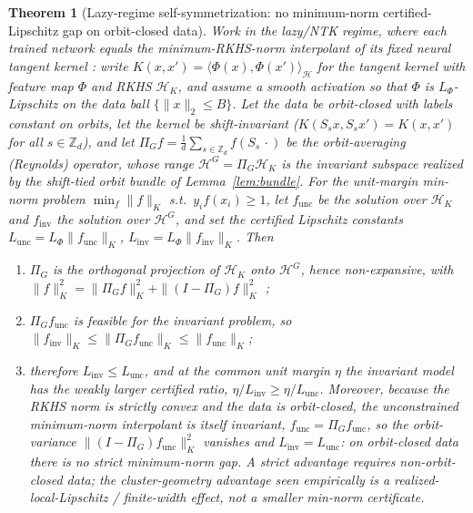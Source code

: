 \documentclass{article}
\newtheorem{theorem}{Theorem}
\theoremstyle{definition}
\newcommand{\Z}{\mathbb{Z}}
\newcommand{\dd}{d}
\begin{document}
\begin{theorem}[Lazy-regime self-symmetrization: no minimum-norm certified-Lipschitz gap on orbit-closed data]\label{thm:lazy-cluster}
Work in the lazy/NTK regime, where each trained network equals the minimum-RKHS-norm
interpolant of its fixed neural tangent kernel \citep{jacot2018neural}: write
$K(x,x')=\langle\Phi(x),\Phi(x')\rangle_{\mathcal H}$ for the tangent kernel with feature
map $\Phi$ and RKHS $\mathcal H_K$, and assume a smooth activation so that $\Phi$ is
$L_\Phi$-Lipschitz on the data ball $\{\|x\|_2\le B\}$. Let the data be orbit-closed with
labels constant on orbits, let the kernel be shift-invariant
($K(S_sx,S_sx')=K(x,x')$ for all $s\in\Z_\dd$), and let
$\Pi_G f=\tfrac1\dd\sum_{s\in\Z_\dd}f(S_s\,\cdot)$ be the orbit-averaging (Reynolds)
operator, whose range $\mathcal H^G=\Pi_G\mathcal H_K$ is the invariant subspace realized by
the shift-tied orbit bundle of Lemma~\ref{lem:bundle}. For the unit-margin min-norm problem
$\min_{f}\|f\|_K$ s.t.\ $y_i f(x_i)\ge1$, let $f_{\mathrm{unc}}$ be the solution over
$\mathcal H_K$ and $f_{\mathrm{inv}}$ the solution over $\mathcal H^G$, and set the certified
Lipschitz constants $L_{\mathrm{unc}}=L_\Phi\|f_{\mathrm{unc}}\|_K$,
$L_{\mathrm{inv}}=L_\Phi\|f_{\mathrm{inv}}\|_K$. Then
\begin{enumerate}[leftmargin=1.7em,label=\textup{(\roman*)}]
\item $\Pi_G$ is the orthogonal projection of $\mathcal H_K$ onto $\mathcal H^G$, hence
  non-expansive, with $\|f\|_K^2=\|\Pi_G f\|_K^2+\|(I-\Pi_G)f\|_K^2$ \citep{elesedy2021provably};
\item $\Pi_G f_{\mathrm{unc}}$ is feasible for the invariant problem, so
  $\|f_{\mathrm{inv}}\|_K\le\|\Pi_G f_{\mathrm{unc}}\|_K\le\|f_{\mathrm{unc}}\|_K$;
\item therefore $L_{\mathrm{inv}}\le L_{\mathrm{unc}}$, and at the common unit margin $\eta$
  the invariant model has the weakly larger certified ratio,
  $\eta/L_{\mathrm{inv}}\ge\eta/L_{\mathrm{unc}}$. Moreover, because the RKHS norm is strictly
  convex and the data is orbit-closed, the unconstrained minimum-norm interpolant is itself
  invariant, $f_{\mathrm{unc}}=\Pi_G f_{\mathrm{unc}}$, so the orbit-variance
  $\|(I-\Pi_G)f_{\mathrm{unc}}\|_K^2$ vanishes and $L_{\mathrm{inv}}=L_{\mathrm{unc}}$: on
  orbit-closed data there is \emph{no} strict minimum-norm gap. A strict advantage requires
  non-orbit-closed data; the cluster-geometry advantage seen empirically is a
  realized-local-Lipschitz / finite-width effect, not a smaller min-norm certificate.
\end{enumerate}
\end{theorem}
\end{document}
